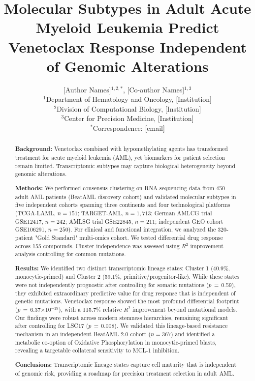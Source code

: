 \documentclass[11pt,a4paper]{article}
\title{\Large\textbf{Molecular Subtypes in Adult Acute Myeloid Leukemia Predict Venetoclax Response Independent of Genomic Alterations}}
\author{
[Author Names]$^{1,2,*}$, [Co-author Names]$^{1,3}$ \\[0.3cm]
\small $^1$Department of Hematology and Oncology, [Institution] \\
\small $^2$Division of Computational Biology, [Institution] \\
\small $^3$Center for Precision Medicine, [Institution] \\[0.2cm]
\small $^*$Correspondence: [email]
}
\date{}
\newcommand{\pval}[1]{$p$\,$=$\,#1}
\begin{document}
\maketitle

\begin{abstract}
\sloppy
\sloppy
\noindent\textbf{Background:} Venetoclax combined with hypomethylating agents has transformed treatment for acute myeloid leukemia (AML), yet biomarkers for patient selection remain limited. Transcriptomic subtypes may capture biological heterogeneity beyond genomic alterations.

\noindent\textbf{Methods:} We performed consensus clustering on RNA-sequencing data from 450 adult AML patients (BeatAML discovery cohort) and validated molecular subtypes in five independent cohorts spanning three continents and four technological platforms (TCGA-LAML, $n=151$; TARGET-AML, $n=1{,}713$; German AMLCG trial GSE12417, $n=242$; AMLSG trial GSE22845, $n=211$; independent GEO cohort GSE106291, $n=250$). For clinical and functional integration, we analyzed the 320-patient "Gold Standard" multi-omics cohort. We tested differential drug response across 155 compounds. Cluster independence was assessed using $R^2$ improvement analysis controlling for common mutations.

\noindent\textbf{Results:} We identified two distinct transcriptomic lineage states: Cluster 1 (40.9\%, monocytic\allowbreak-primed) and Cluster 2 (59.1\%, primitive\slash\allowbreak progenitor-like). While these states were not independently prognostic after controlling for somatic mutations (\pval{0.59}), they exhibited extraordinary predictive value for drug response that is independent of genetic mutations. Venetoclax response showed the most profound differential footprint (\pval{6.37$\times$10$^{-19}$}), with a 115.7\% relative $R^2$ improvement beyond mutational models. Our findings were robust across modern stemness hierarchies, remaining significant after controlling for LSC17 (\pval{0.008}). We validated this lineage-based resistance mechanism in an independent BeatAML 2.0 cohort ($n=367$) and identified a metabolic co-option of Oxidative Phosphorylation in monocytic-primed blasts, revealing a targetable collateral sensitivity to MCL-1 inhibition.

\noindent\textbf{Conclusions:} Transcriptomic lineage states capture cell maturity that is independent of genomic risk, providing a roadmap for precision treatment selection in adult AML.
\end{abstract}
\end{document}
